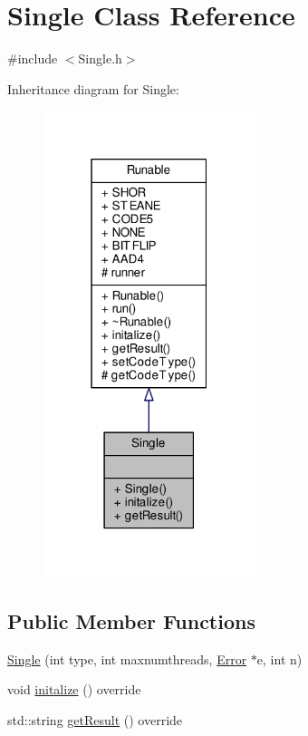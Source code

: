 \hypertarget{class_single}{}\section{Single Class Reference}
\label{class_single}


{\ttfamily \#include $<$Single.\+h$>$}



Inheritance diagram for Single\+:\nopagebreak
\begin{figure}[H]
\begin{center}
\leavevmode
\includegraphics[width=175pt]{class_single__inherit__graph}
\end{center}
\end{figure}
\subsection*{Public Member Functions}
\begin{DoxyCompactItemize}
\item 
\hyperlink{class_single_ac3a75d9c9c94671ba0246b581982db69}{Single} (int type, int maxnumthreads, \hyperlink{class_error}{Error} $\ast$e, int n)
\item 
void \hyperlink{class_single_afa7dc40314a46c75553a1de77ce020e9}{initalize} () override
\item 
std\+::string \hyperlink{class_single_adcafbbcea43758d47c2f8b4e0704c8dd}{get\+Result} () override
\end{DoxyCompactItemize}
